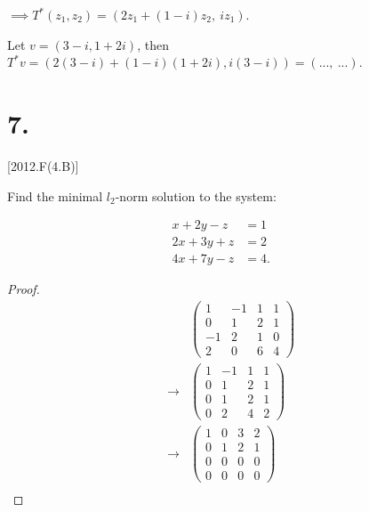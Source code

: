 \documentclass{article}
\begin{document}
  $\implies T^*(z_1, z_2) = (2z_1 + (1-i)z_2,\: iz_1)$.

  Let $v = (3-i, 1+2i)$, then 
  $T^*v 
  = (2(3-i) + (1-i)(1+2i), i(3-i))
  = (...,\: ...)$.
  
  \newpage


  \section*{7.}[2012.F(4.B)]

  Find the minimal $l_2$-norm solution to the system:

  \begin{align*}
    x + 2y  - z &= 1 &&\\
    2x + 3y + z &= 2 &&\\
    4x + 7y - z &= 4.
  \end{align*}

  \newpage
  \begin{proof}
    \begin{align*}
      &
      \begin{pmatrix}
        1 & -1 & 1 & 1 \\
        0 & 1 & 2  & 1 \\
        -1 & 2 & 1  & 0 \\
        2 & 0 & 6 & 4
      \end{pmatrix} \\
      \rightarrow& 
      \begin{pmatrix}
        1 & -1 & 1 & 1 \\
        0 & 1 & 2  & 1 \\
        0 & 1 & 2  & 1 \\
        0 & 2 & 4 & 2
      \end{pmatrix} \\
      \rightarrow& 
      \begin{pmatrix}
        1 & 0 & 3 & 2 \\
        0 & 1 & 2  & 1 \\
        0 & 0 & 0  & 0 \\
        0 & 0 & 0 & 0
      \end{pmatrix} \\
    \end{align*}
  \end{proof}
\end{document}
